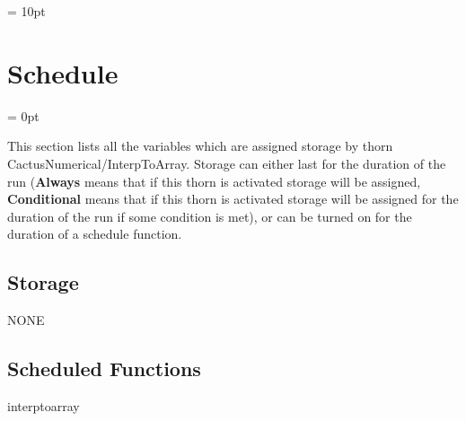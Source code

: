 \vspace{5mm}\parskip = 10pt 

\section{Schedule} 


\parskip = 0pt


\noindent This section lists all the variables which are assigned storage by thorn CactusNumerical/InterpToArray.  Storage can either last for the duration of the run ({\bf Always} means that if this thorn is activated storage will be assigned, {\bf Conditional} means that if this thorn is activated storage will be assigned for the duration of the run if some condition is met), or can be turned on for the duration of a schedule function.


\subsection*{Storage}NONE
\subsection*{Scheduled Functions}
\vspace{5mm}


\hspace{5mm} interptoarray 

\hspace{5mm}{\it interpolate to grid arrays } 


\hspace{5mm}

